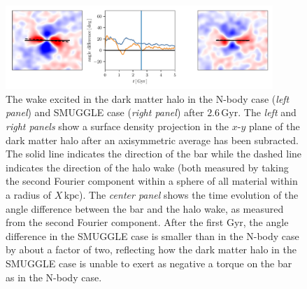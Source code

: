 \documentclass{natureprintstyle}
\begin{document}
\begin{figure}[h!]%
\centering
\includegraphics[width=0.9\textwidth]{fig/fig3.pdf}
\caption{The wake excited in the dark matter halo in the N-body case
(\textit{left panel}) and SMUGGLE case (\textit{right panel}) after
$2.6\,\textrm{Gyr}$. The \textit{left} and \textit{right panels} show a
surface density projection in the $x$-$y$ plane of the dark matter halo after
an axisymmetric average has been subracted. The solid line indicates the
direction of the bar while the dashed line indicates the direction of the halo
wake (both measured by taking the second Fourier component within a sphere of
all material within a radius of $X\,\textrm{kpc}$). The \textit{center panel}
shows the time evolution of the angle difference between the bar and the halo
wake, as measured from the second Fourier component. After the first Gyr, the
angle difference in the SMUGGLE case is smaller than in the N-body case by
about a factor of two, reflecting how the dark matter halo in the SMUGGLE case
is unable to exert as negative a torque on the bar as in the N-body
case.}\label{fig:wake}
\end{figure}
\end{document}
